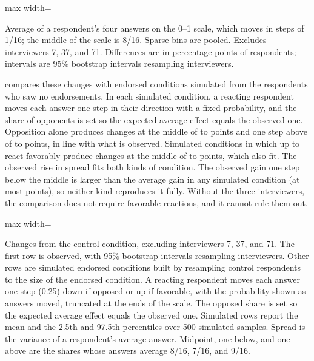 \documentclass[11pt,letterpaper]{article}
\newcommand{\TableStyle}{\normalsize\setlength{\tabcolsep}{6pt}\renewcommand{\arraystretch}{1}}
\newcommand{\tablenote}[1]{\par\smallskip\begin{minipage}{\linewidth}\footnotesize #1\end{minipage}}
\begin{document}
\begin{table}[htbp]
\centering\TableStyle
\caption{Distribution of each respondent's average answer, by condition}
\label{tab:person_means}
\begin{adjustbox}{max width=\linewidth}

\end{adjustbox}
\tablenote{Average of a respondent's four answers on the 0--1 scale, which moves in steps of 1/16; the middle of the scale is 8/16. Sparse bins are pooled. Excludes interviewers 7, 37, and 71. Differences are in percentage points of respondents; intervals are 95\% bootstrap intervals resampling interviewers.}
\end{table}

 compares these changes with endorsed conditions simulated from the respondents who saw no endorsements. In each simulated condition, a reacting respondent moves each answer one step in their direction with a fixed probability, and the share of opponents is set so the expected average effect equals the observed one. Opposition alone produces changes at the middle of \OneSidedMidpointMin{} to \OneSidedMidpointMax{} points and one step above of \OneSidedAboveMin{} to \OneSidedAboveMax{} points, in line with what is observed. Simulated conditions in which up to \TwoSidedTopFavour{} react favorably produce changes at the middle of \TwoSidedMidpointMin{} to \TwoSidedMidpointMax{} points, which also fit. The observed rise in spread fits both kinds of condition. The observed gain one step below the middle is larger than the average gain in any simulated condition (at most \WorldBelowMax{} points), so neither kind reproduces it fully. Without the three interviewers, the comparison does not require favorable reactions, and it cannot rule them out.

\begin{table}[htbp]
\centering\TableStyle
\caption{Observed and simulated changes under endorsement}
\label{tab:reaction_worlds}
\begin{adjustbox}{max width=\linewidth}

\end{adjustbox}
\tablenote{Changes from the control condition, excluding interviewers 7, 37, and 71. The first row is observed, with 95\% bootstrap intervals resampling interviewers. Other rows are simulated endorsed conditions built by resampling control respondents to the size of the endorsed condition. A reacting respondent moves each answer one step (0.25) down if opposed or up if favorable, with the probability shown as answers moved, truncated at the ends of the scale. The opposed share is set so the expected average effect equals the observed one. Simulated rows report the mean and the 2.5th and 97.5th percentiles over 500 simulated samples. Spread is the variance of a respondent's average answer. Midpoint, one below, and one above are the shares whose answers average 8/16, 7/16, and 9/16.}
\end{table}
\end{document}
